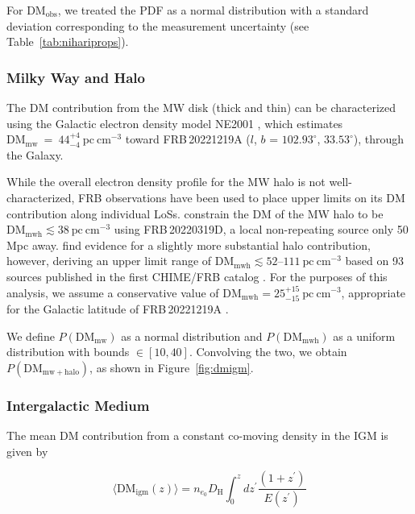 \documentclass[twocolumn, linenumbers, tra]{aastex631}
\newcommand{\rev}[1]{{\color{purple}#1}}
\newcommand{\nihari}{FRB\,20221219A } %
\begin{document}
\rev{For $\mathrm{DM}_{\mathrm{obs}}$, we treated the PDF as a normal distribution with a standard deviation corresponding to the measurement uncertainty (see Table~\ref{tab:nihariprops}).}

\subsubsection{Milky Way and Halo}\label{sec:mwdm}

The DM contribution from the MW disk (thick and thin) can be characterized using the Galactic electron density model NE2001 \citep{Cordes2002}, which estimates $\mathrm{DM}_{\mathrm{mw}}\ =\ 44^{+4}_{-4} \ \mathrm{pc} \ \mathrm{cm}^{-3}$ \citep[assuming $ \sim 10 \%$ uncertainty, following][]{Ocker2020} toward \nihari ($l$, $b$ = $102.93^{\circ}$, $33.53^{\circ}$), through the Galaxy. 

While the overall electron density profile for the MW halo is not well-characterized, FRB observations have been used to place upper limits on its DM contribution along individual LoSs. \citet{Ravi2023a} constrain the DM of the MW halo to be $\mathrm{DM}_{\mathrm{mwh}} \lesssim 38\ \mathrm{pc\ cm^{-3}}$ using FRB\,20220319D, a local non-repeating source only 50 Mpc away. \citet{Cook2023} find evidence for a slightly more substantial halo contribution, however, deriving an upper limit range of $\mathrm{DM}_{\mathrm{mwh}} \lesssim 52$--$111\ \mathrm{pc\ cm^{-3}}$ based on 93 sources published in the first CHIME/FRB catalog \citep{chime2021}. For the purposes of this analysis, we assume a conservative value of $\mathrm{DM}_{\mathrm{mwh}} = 25^{+15}_{-15}\ \mathrm{pc} \ \mathrm{cm}^{-3}$, appropriate for the Galactic latitude of \nihari.

We define $P\left(\mathrm{DM}_{\mathrm{mw}}\right)$ as a normal distribution and $P\left(\mathrm{DM}_{\mathrm{mwh}}\right)$ as a uniform distribution with bounds $\in[10,40]$. Convolving the two, we obtain $P\left(\mathrm{DM}_{\mathrm{mw + halo}}\right)$, as shown in Figure\ \ref{fig:dmigm}.

\subsubsection{Intergalactic Medium}\label{sec:igmdm}

The mean DM contribution from a constant co-moving density in the IGM is given by \citep[e.g.,][]{McQuinn2014}

\begin{equation}\label{eq:dmigm}
\langle\mathrm{DM}_{\mathrm{igm}}(z)\rangle = n_{e_0} D_{\mathrm{H}} \int_0^z d z^{\prime} \frac{\left(1+z^{\prime}\right)}{E\left(z^{\prime}\right)}
\end{equation}
\end{document}
